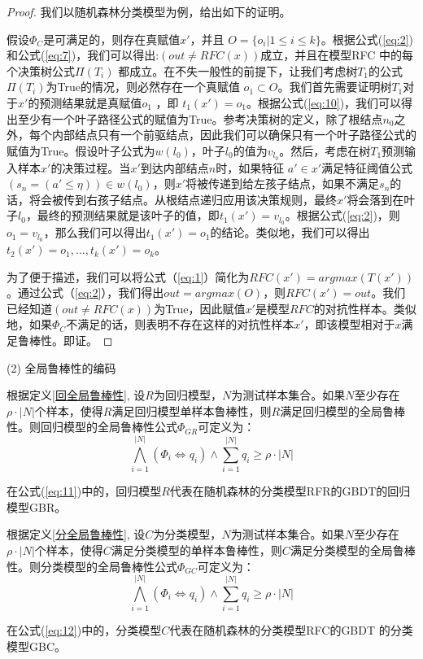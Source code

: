 \begin{proof}
我们以随机森林分类模型为例，给出如下的证明。

假设$\Phi_C$是可满足的，则存在真赋值$x'$，并且 $O=\{o_i|1\le i \le k\}$。根据公式(\ref{eq:2})和公式(\ref{eq:7})，我们可以得出:$(out \ne RFC(x))$成立，并且在模型RFC 中的每个决策树公式$\Pi(T_i)$
都成立。在不失一般性的前提下，让我们考虑树$T_1$的公式$\Pi(T_i)$为True的情况，则必然存在一个真赋值 $o_1 \subset O$。我们首先需要证明树$T_1$对于$x'$的预测结果就是真赋值$o_1$ ，即 $t_1(x') = o_1$。根据公式(\ref{eq:10})，我们可以得出至少有一个叶子路径公式的赋值为True。参考决策树的定义，除了根结点$n_0$之外，每个内部结点只有一个前驱结点，因此我们可以确保只有一个叶子路径公式的赋值为True。假设叶子公式为$w(l_0)$，叶子$l_0$的值为$v_{l_0}$。然后，考虑在树$T_1$预测输入样本$x'$的决策过程。当$x'$到达内部结点$n$时，如果特征 $a'\in x'$满足特征阈值公式$(s_n=(a' \le \eta))\in w(l_0)$，则$x'$将被传递到给左孩子结点，如果不满足$s_n$的话，将会被传到右孩子结点。从根结点递归应用该决策规则，最终$x'$将会落到在叶子$l_0$，最终的预测结果就是该叶子的值，即$t_1(x')=v_{l_0}$。根据公式(\ref{eq:2})，则$o_1 = v_{l_0}$，那么我们可以得出$t_1(x') = o_1$的结论。类似地，我们可以得出$t_2(x') = o_1,...,t_k(x')=o_k$。

为了便于描述，我们可以将公式（\ref{eq:1}）简化为$RFC(x')=argmax(T(x'))$。通过公式（\ref{eq:2}），我们得出$out=argmax(O)$，则$RFC(x')=out$。我们已经知道$(out \ne RFC(x))$为True，因此赋值$x'$是模型$RFC$的对抗性样本。类似地，如果$\Phi_C$不满足的话，则表明不存在这样的对抗性样本$x'$，即该模型相对于$x$满足鲁棒性。即证。
\end{proof}

(2) 全局鲁棒性的编码

\begin{define}[回归模型全局鲁棒性公式]\label{回归模型全局鲁棒性公式}
根据定义\ref{回全局鲁棒性}, 设$R$为回归模型，$N$为测试样本集合。如果$N$至少存在$\rho \cdot |N|$个样本，使得$R$满足回归模型单样本鲁棒性，则$R$满足回归模型的全局鲁棒性。则回归模型的全局鲁棒性公式$\Phi_{GR}$可定义为：
\begin{equation}\label{eq:11}
\bigwedge_{i=1}^{|N|}\left(\Phi_{i} \Leftrightarrow q_{i}\right) \wedge \sum_{i=1}^{|N|} q_{i} \geq \rho \cdot|N|
\end{equation}
\end{define}
在公式(\ref{eq:11})中的，回归模型$R$代表在随机森林的分类模型RFR的GBDT的回归模型GBR。

\begin{define}[分类模型全局鲁棒性公式]\label{分类模型全局鲁棒性公式}
根据定义\ref{分全局鲁棒性}, 设$C$为分类模型，$N$为测试样本集合。如果$N$至少存在$\rho \cdot |N|$个样本，使得$C$满足分类模型的单样本鲁棒性，则$C$满足分类模型的全局鲁棒性。则分类模型的全局鲁棒性公式$\Phi_{GC}$可定义为：
\begin{equation}\label{eq:12}
\bigwedge_{i=1}^{|N|}\left(\Phi_{i} \Leftrightarrow q_{i}\right) \wedge \sum_{i=1}^{|N|} q_{i} \geq \rho \cdot|N|
\end{equation}
\end{define}
在公式(\ref{eq:12})中的，分类模型$C$代表在随机森林的分类模型RFC的GBDT 的分类模型GBC。

